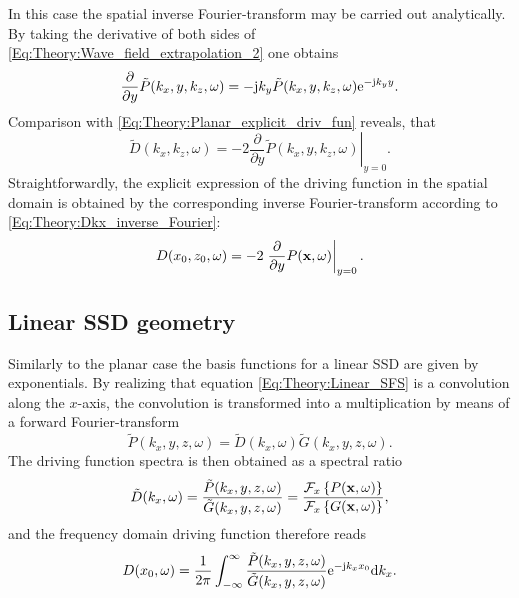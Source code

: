 \vspace{3mm}
In this case the spatial inverse Fourier-transform may be carried out analytically.
By taking the derivative of both sides of \eqref{Eq:Theory:Wave_field_extrapolation_2} one obtains
\begin{equation}
\frac{\partial}{\partial y}  \tilde{P}(k_x,y,k_z,\omega) = - \mathrm{j} k_y  \tilde{P}(k_x,y,k_z,\omega) \mathrm{e}^{-\mathrm{j} k_y y}.
\end{equation}
Comparison with \eqref{Eq:Theory:Planar_explicit_driv_fun} reveals, that 
\begin{equation}
\tilde{D}(k_x,k_z,\omega) = -2 \left. \frac{\partial}{\partial y} \tilde{P}(k_x,y,k_z,\omega) \right|_{y = 0}.
\label{Eq:Theory:Planar_explicit_driv_fun_spatial}
\end{equation}
Straightforwardly, the explicit expression of the driving function in the spatial domain is obtained by the corresponding inverse Fourier-transform according to \eqref{Eq:Theory:Dkx_inverse_Fourier}:
\begin{equation}
D(x_0,z_0,\omega) = -2 \left. \frac{\partial}{\partial y} P(\mathbf{x},\omega) \right|_{y = 0}.
\label{Eq:Theory:Planar_explicit_driv_fun_spatial}
\end{equation}

\subsection{Linear SSD geometry}

Similarly to the planar case the basis functions for a linear SSD are given by exponentials.
By realizing that equation \eqref{Eq:Theory:Linear_SFS} is a convolution along the $x$-axis,
the convolution is transformed into a multiplication by means of a forward Fourier-transform
\begin{equation}
\tilde{P}(k_x,y,z, \omega) = \tilde{D}(k_x,\omega)\tilde{G}(k_x,y,z, \omega).
\end{equation}
The driving function spectra is then obtained as a spectral ratio
\begin{equation}
\tilde{D}(k_x,\omega) = \frac{\tilde{P}(k_x,y,z, \omega)}{\tilde{G}(k_x,y,z, \omega)} = \frac{\mathcal{F}_x\left\{ P(\mathbf{x},\omega) \right\}}{\mathcal{F}_x\left\{ G(\mathbf{x},\omega) \right\}},
\end{equation}
and the frequency domain driving function therefore reads
\begin{equation}
D(x_0,\omega) = \frac{1}{2\pi} \int_{-\infty}^{\infty} \frac{\tilde{P}(k_x,y,z, \omega) }{\tilde{G}(k_x,y,z, \omega)} \mathrm{e}^{-\mathrm{j} k_x x_0} \mathrm{d} k_x.
\label{Eq:Theory:LinearSDM1}
\end{equation}

